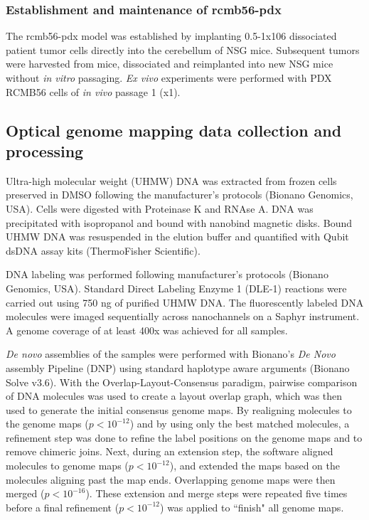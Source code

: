 \subsubsection{Establishment and maintenance of \acrshort{rcmb56-pdx}}
The \acrlong{rcmb56-pdx} model was established by implanting 0.5-1x106 dissociated patient tumor cells directly into the cerebellum of NSG mice. Subsequent tumors were harvested from mice, dissociated and reimplanted into new NSG mice without \textit{in vitro} passaging. \textit{Ex vivo} experiments were performed with PDX RCMB56 cells of \textit{in vivo} passage 1 (x1).

\subsection{Optical genome mapping data collection and processing}
Ultra-high molecular weight (UHMW) DNA was extracted from frozen cells preserved in DMSO following the manufacturer's protocols (Bionano Genomics, USA). Cells were digested with Proteinase K and RNAse A. DNA was precipitated with isopropanol and bound with nanobind magnetic disks. Bound UHMW DNA was resuspended in the elution buffer and quantified with Qubit dsDNA assay kits (ThermoFisher Scientific).
\par DNA labeling was performed following manufacturer's protocols (Bionano Genomics, USA). Standard Direct Labeling Enzyme 1 (DLE-1) reactions were carried out using 750 ng of purified UHMW DNA. The fluorescently labeled DNA molecules were imaged sequentially across nanochannels on a Saphyr instrument. A genome coverage of at least 400x was achieved for all samples. 
\par \textit{De novo} assemblies of the samples were performed with Bionano's \textit{De Novo} assembly Pipeline (DNP) using standard haplotype aware arguments (Bionano Solve v3.6). With the Overlap-Layout-Consensus paradigm, pairwise comparison of DNA molecules was used to create a layout overlap graph, which was then used to generate the initial consensus genome maps. By realigning molecules to the genome maps ($p<10^{-12}$) and by using only the best matched molecules, a refinement step was done to refine the label positions on the genome maps and to remove chimeric joins. Next, during an extension step, the software aligned molecules to genome maps ($p<10^{-12}$), and extended the maps based on the molecules aligning past the map ends. Overlapping genome maps were then merged ($p<10^{-16}$). These extension and merge steps were repeated five times before a final refinement ($p<10^{-12}$) was applied to ``finish" all genome maps.

